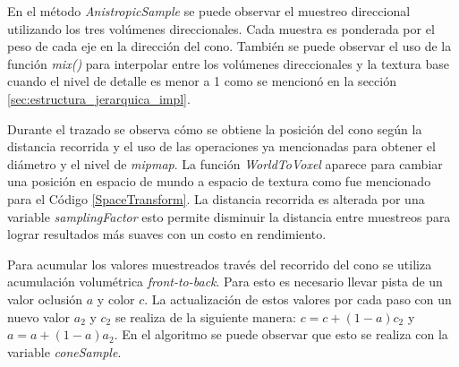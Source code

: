 En el método \emph{AnistropicSample} se puede observar el muestreo direccional utilizando los tres volúmenes direccionales. Cada muestra es ponderada por el peso de cada eje en la dirección del cono. También se puede observar el uso de la función \emph{mix()} para interpolar entre los volúmenes direccionales y la textura base cuando el nivel de detalle es menor a 1 como se mencionó en la sección \ref{sec:estructura_jerarquica_impl}.

Durante el trazado se observa cómo se obtiene la posición del cono según la distancia recorrida y el uso de las operaciones ya mencionadas para obtener el diámetro y el nivel de \emph{mipmap}. La función \emph{WorldToVoxel} aparece para cambiar una posición en espacio de mundo a espacio de textura como fue mencionado para el Código \ref{SpaceTransform}. La distancia recorrida es alterada por una variable \emph{samplingFactor} esto permite disminuir la distancia entre muestreos para lograr resultados más suaves con un costo en rendimiento.

Para acumular los valores muestreados través del recorrido del cono se utiliza acumulación volumétrica \emph{front-to-back}. Para esto es necesario llevar pista de un valor oclusión $a$ y color $c$. La actualización de estos valores por cada paso con un nuevo valor $a_2$ y $c_2$ se realiza de la siguiente manera: $c=c+(1-a)c_2$ y $a=a+(1-a)a_2$. En el algoritmo se puede observar que esto se realiza con la variable \emph{coneSample}.

